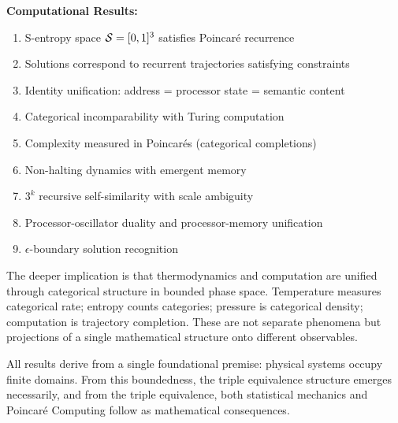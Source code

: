 \textbf{Computational Results:}
\begin{enumerate}
    \item S-entropy space $\mathcal{S} = [0,1]^3$ satisfies Poincar\'e recurrence
    \item Solutions correspond to recurrent trajectories satisfying constraints
    \item Identity unification: address = processor state = semantic content
    \item Categorical incomparability with Turing computation
    \item Complexity measured in Poincar\'es (categorical completions)
    \item Non-halting dynamics with emergent memory
    \item $3^k$ recursive self-similarity with scale ambiguity
    \item Processor-oscillator duality and processor-memory unification
    \item $\epsilon$-boundary solution recognition
\end{enumerate}

The deeper implication is that thermodynamics and computation are unified through categorical structure in bounded phase space. Temperature measures categorical rate; entropy counts categories; pressure is categorical density; computation is trajectory completion. These are not separate phenomena but projections of a single mathematical structure onto different observables.

All results derive from a single foundational premise: physical systems occupy finite domains. From this boundedness, the triple equivalence structure emerges necessarily, and from the triple equivalence, both statistical mechanics and Poincar\'e Computing follow as mathematical consequences.



